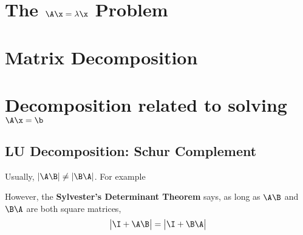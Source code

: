\section{The $\A\x=\lambda \x$ Problem}

\section{Matrix Decomposition}
\section{Decomposition related to solving $\A\x = \b$}
\subsection{LU Decomposition: Schur Complement}
Usually, $|\A\B| \ne |\B\A|$. For example

However, the {\bf{Sylvester's Determinant Theorem}} says, as long as $\A\B$ and $\B\A$ are both square matrices,
\begin{align}
    \begin{vmatrix}\I+\A\B\end{vmatrix} = \begin{vmatrix}\I+\B\A\end{vmatrix}
\end{align}

